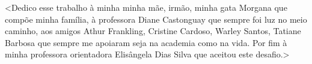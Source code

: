 \begin{dedicatoria}
\textless Dedico esse trabalho à minha minha mãe, irmão, minha gata Morgana que compõe minha família, à professora Diane Castonguay que sempre foi luz no meio caminho, aos amigos Athur Frankling, Cristine Cardoso, Warley Santos, Tatiane Barbosa que sempre me apoiaram seja na academia como na vida. Por fim à minha professora orientadora  Elisângela Dias Silva que aceitou este desafio.\textgreater
\end{dedicatoria}